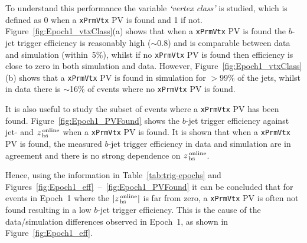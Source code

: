 To understand this performance the variable \textit{`vertex class'} is studied, which is defined as 0 when a \verb|xPrmVtx| PV is found and 1 if not.
Figure~\ref{fig:Epoch1_vtxClass}(a) shows that when a \verb|xPrmVtx| PV is found the $b$-jet trigger efficiency is reasonably high ($\sim$0.8)
and is comparable between data and simulation (within~5\%),
whilst if no \verb|xPrmVtx| PV is found then efficiency is close to zero in both simulation and data.
However, Figure~\ref{fig:Epoch1_vtxClass}(b) shows that a \verb|xPrmVtx| PV is found in simulation for $>99$\% of the jets,
whilst in data there is $\sim$16\% of events where no \verb|xPrmVtx| PV is found.

It is also useful to study the subset of events where a \verb|xPrmVtx| PV has been found.
Figure~\ref{fig:Epoch1_PVFound} shows the $b$-jet trigger efficiency
against jet-\pT{} and $z_{\,\text{bs}}^{\text{\,online}}$ when a \verb|xPrmVtx| PV is found.
It is shown that when a \verb|xPrmVtx| PV is found, the measured $b$-jet trigger efficiency in data and simulation are in agreement
and there is no strong dependence on $z_{\,\text{bs}}^{\text{\,online}}$.

Hence, using the information in Table~\ref{tab:trig-epochs} and Figures~\ref{fig:Epoch1_eff}~--~\ref{fig:Epoch1_PVFound}
it can be concluded that for events in  Epoch~1 where the  $|z_{\,\text{bs}}^{\text{\,online}}|$ is far from zero,
a \verb|xPrmVtx| PV is often not found resulting in a low $b$-jet trigger efficiency.
This is the cause of the data/simulation differences observed in Epoch~1, as shown in Figure~\ref{fig:Epoch1_eff}. 


